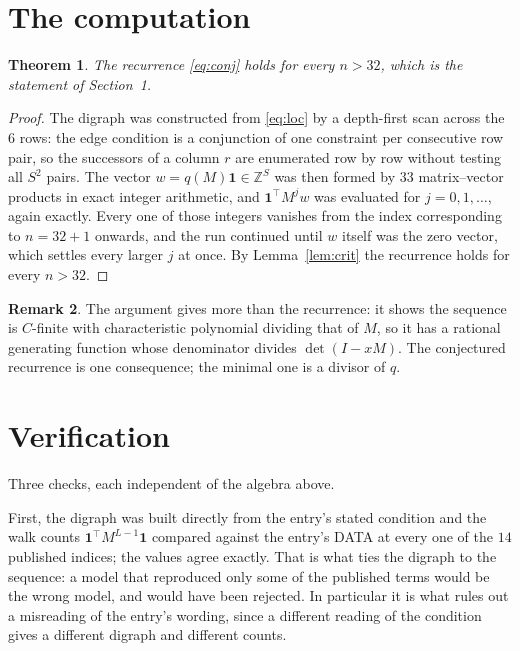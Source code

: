 \documentclass[11pt,a4paper]{article}
\theoremstyle{plain}
\newtheorem{theorem}{Theorem}
\theoremstyle{definition}
\newtheorem{remark}[theorem]{Remark}
\begin{document}
\section{The computation}

\begin{theorem}
The recurrence \eqref{eq:conj} holds for every $n>32$, which is the statement of
Section~1.
\end{theorem}

\begin{proof}
The digraph was constructed from \eqref{eq:loc} by a depth-first scan across the $6$
rows: the edge condition is a conjunction of one constraint per consecutive row
pair, so the successors of a column $r$ are enumerated row by row without testing all
$S^2$ pairs. The vector $w=q(M)\mathbf{1}\in\mathbb{Z}^{S}$ was then formed by $33$
matrix--vector products in exact integer arithmetic, and $\mathbf{1}^{\!\top}M^{j}w$ was
evaluated for $j=0,1,\dots$, again exactly. Every one of those integers vanishes from the
index corresponding to $n=32+1$ onwards, and the run continued until $w$ itself was the
zero vector, which settles every larger $j$ at once. By Lemma~\ref{lem:crit} the recurrence
holds for every $n>32$.
\end{proof}

\begin{remark}
The argument gives more than the recurrence: it shows the sequence is $C$-finite with
characteristic polynomial dividing that of $M$, so it has a rational generating function
whose denominator divides $\det(I-xM)$. The conjectured recurrence is one consequence; the
minimal one is a divisor of $q$.
\end{remark}

\section{Verification}

Three checks, each independent of the algebra above.

First, the digraph was built directly from the entry's stated condition and the walk counts
$\mathbf{1}^{\!\top}M^{L-1}\mathbf{1}$ compared against the entry's DATA at
every one of the $14$ published indices; the values agree exactly. That is what ties
the digraph to the sequence: a model that reproduced only some of the published terms would
be the wrong model, and would have been rejected. In particular it is what rules out a
misreading of the entry's wording, since a different reading of the condition gives a
different digraph and different counts.
\end{document}

